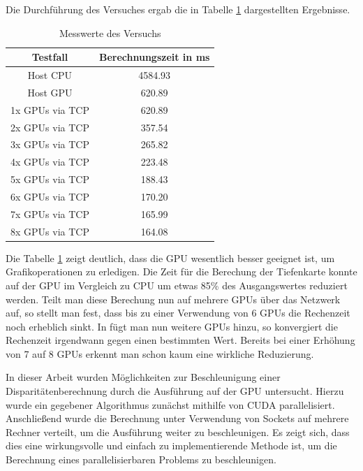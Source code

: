 \documentclass[times, 10pt,twocolumn]{article}
\begin{document}
Die Durchführung des Versuches ergab die in Tabelle \ref{tab:messwerte} dargestellten Ergebnisse.
\begin{table}
\begin{tabular}{|c|c|}
\hline
 \textbf{Testfall} & \textbf{Berechnungszeit in ms} \\
\hline
 Host CPU & 4584.93 \\
\hline
 Host GPU & 620.89  \\
\hline
 1x GPUs via TCP & 620.89  \\
\hline
 2x GPUs via TCP & 357.54  \\
 \hline
 3x GPUs via TCP & 265.82  \\
 \hline
 4x GPUs via TCP & 223.48  \\
 \hline
 5x GPUs via TCP & 188.43  \\
 \hline
 6x GPUs via TCP & 170.20  \\
 \hline
 7x GPUs via TCP & 165.99  \\
 \hline
 8x GPUs via TCP & 164.08  \\
 \hline
\end{tabular}
\caption{Messwerte des Versuchs}
\label{tab:messwerte}
\end{table}

Die Tabelle \ref{tab:messwerte} zeigt deutlich, dass die GPU wesentlich besser geeignet ist, um Grafikoperationen zu erledigen. Die Zeit für die Berechung der Tiefenkarte konnte auf der GPU im Vergleich zu CPU um etwas 85\% des Ausgangswertes reduziert werden. Teilt man diese Berechung nun auf mehrere GPUs über das Netzwerk auf, so stellt man fest, dass bis zu einer Verwendung von 6 GPUs die Rechenzeit noch erheblich sinkt. In fügt man nun weitere GPUs hinzu, so konvergiert die Rechenzeit irgendwann gegen einen bestimmten Wert. Bereits bei einer Erhöhung von 7 auf 8 GPUs erkennt man schon kaum eine wirkliche Reduzierung.

In dieser Arbeit wurden Möglichkeiten zur Beschleunigung einer Disparitätenberechnung durch die Ausführung auf der GPU untersucht. Hierzu wurde ein gegebener Algorithmus zunächst mithilfe von CUDA parallelisiert. Anschließend wurde die Berechnung unter Verwendung von Sockets auf mehrere Rechner verteilt, um die Ausführung weiter zu beschleunigen. Es zeigt sich, dass dies eine wirkungsvolle und einfach zu implementierende Methode ist, um die Berechnung eines parallelisierbaren Problems zu beschleunigen.








\end{document}
